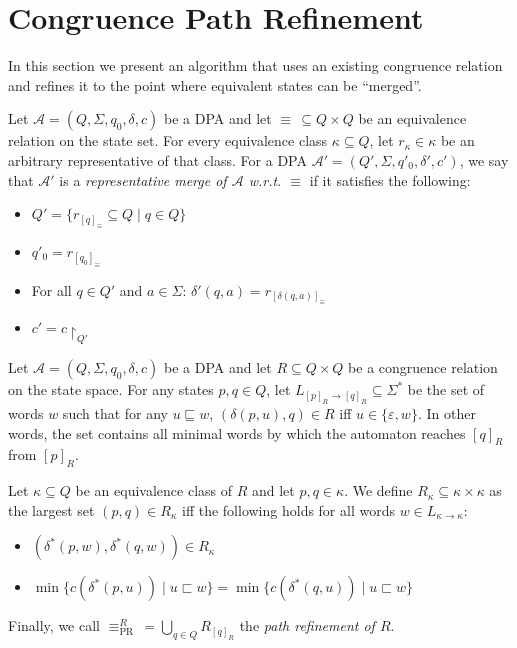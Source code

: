 
\section{Congruence Path Refinement}

In this section we present an algorithm that uses an existing congruence relation and refines it to the point where equivalent states can be \enquote{merged}.

\begin{defn}
	Let $\mathcal{A} = (Q, \Sigma, q_0, \delta, c)$ be a DPA and let $\equiv \,\subseteq Q \times Q$ be an equivalence relation on the state set. For every equivalence class $\kappa \subseteq Q$, let $r_\kappa \in \kappa$ be an arbitrary representative of that class. For a DPA $\mathcal{A}' = (Q', \Sigma, q'_0, \delta', c')$, we say that $\mathcal{A}'$ is a \emph{representative merge of $\mathcal{A}$ w.r.t. $\equiv$} if it satisfies the following:
	\begin{itemize}
		\item $Q' = \{ r_{[q]_\equiv} \subseteq Q \mid q \in Q \}$
		\item $q'_0 = r_{[q_0]_\equiv}$
		\item For all $q \in Q'$ and $a \in \Sigma$: $\delta'(q, a) = r_{[\delta(q, a)]_\equiv}$
		\item $c' = c\upharpoonright_{Q'}$
	\end{itemize}
\end{defn}

\begin{defn}
	Let $\mathcal{A} = (Q, \Sigma, q_0, \delta, c)$ be a DPA and let $R \subseteq Q \times Q$ be a congruence relation on the state space. For any states $p, q \in Q$, let $L_{[p]_R \rightarrow [q]_R} \subseteq \Sigma^*$ be the set of words $w$ such that for any $u \sqsubseteq w$, $(\delta(p, u), q) \in R$ iff $u \in \{\varepsilon, w\}$. In other words, the set contains all minimal words by which the automaton reaches $[q]_R$ from $[p]_R$.
	
	Let $\kappa \subseteq Q$ be an equivalence class of $R$ and let $p, q \in \kappa$. We define $R_\kappa \subseteq \kappa \times \kappa$ as the largest set $(p, q) \in R_\kappa$ iff the following holds for all words $w \in L_{\kappa \rightarrow \kappa}$:
	\begin{itemize}
		\item $(\delta^*(p, w), \delta^*(q, w)) \in R_\kappa$
		\item $\min \{ c(\delta^*(p, u)) \mid u \sqsubset w \} = \min \{ c(\delta^*(q, u)) \mid u \sqsubset w \}$
	\end{itemize}
	
	Finally, we call $\equiv_\text{PR}^R \,= \bigcup_{q \in Q} R_{[q]_R}$ the \emph{path refinement of $R$}.
\end{defn}

